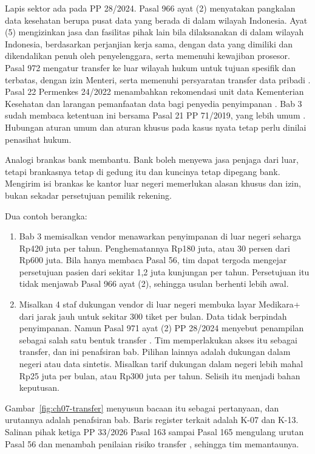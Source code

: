 Lapis sektor ada pada PP 28/2024. Pasal 966 ayat (2) menyatakan pangkalan data kesehatan berupa
pusat data yang berada di dalam wilayah Indonesia. Ayat (5) mengizinkan jasa dan fasilitas pihak
lain bila dilaksanakan di dalam wilayah Indonesia, berdasarkan perjanjian kerja sama, dengan data
yang dimiliki dan dikendalikan penuh oleh penyelenggara, serta memenuhi kewajiban prosesor. Pasal
972 mengatur transfer ke luar wilayah hukum untuk tujuan spesifik dan terbatas, dengan izin Menteri,
serta memenuhi persyaratan transfer data pribadi \cite{pp28-2024-kesehatan}. Pasal 22 Permenkes
24/2022 menambahkan rekomendasi unit data Kementerian Kesehatan dan larangan pemanfaatan data bagi
penyedia penyimpanan \cite{permenkes24-2022}. Bab 3 sudah membaca ketentuan ini bersama Pasal 21 PP
71/2019, yang lebih umum \cite{pp71-2019-pste}. Hubungan aturan umum dan aturan khusus pada kasus
nyata tetap perlu dinilai penasihat hukum.

Analogi brankas bank membantu. Bank boleh menyewa jasa penjaga dari luar, tetapi brankasnya tetap di
gedung itu dan kuncinya tetap dipegang bank. Mengirim isi brankas ke kantor luar negeri memerlukan
alasan khusus dan izin, bukan sekadar persetujuan pemilik rekening.

Dua contoh berangka:
\begin{enumerate}
  \item Bab 3 memisalkan vendor menawarkan penyimpanan di luar negeri seharga Rp420 juta per tahun.
  Penghematannya Rp180 juta, atau 30 persen dari Rp600 juta. Bila hanya membaca Pasal 56, tim dapat
  tergoda mengejar persetujuan pasien dari sekitar 1,2 juta kunjungan per tahun. Persetujuan itu
  tidak menjawab Pasal 966 ayat (2), sehingga usulan berhenti lebih awal.
  \item Misalkan 4 staf dukungan vendor di luar negeri membuka layar Medikara+ dari jarak jauh untuk
  sekitar 300 tiket per bulan. Data tidak berpindah penyimpanan. Namun Pasal 971 ayat (2) PP 28/2024
  menyebut penampilan sebagai salah satu bentuk transfer \cite{pp28-2024-kesehatan}. Tim
  memperlakukan akses itu sebagai transfer, dan ini penafsiran bab. Pilihan lainnya adalah dukungan
  dalam negeri atau data sintetis. Misalkan tarif dukungan dalam negeri lebih mahal Rp25 juta per
  bulan, atau Rp300 juta per tahun. Selisih itu menjadi bahan keputusan.
\end{enumerate}

Gambar~\ref{fig:ch07-transfer} menyusun bacaan itu sebagai pertanyaan, dan urutannya adalah
penafsiran bab. Baris register terkait adalah K-07 dan K-13. Salinan pihak ketiga PP 33/2026 Pasal
163 sampai Pasal 165 mengulang urutan Pasal 56 dan menambah penilaian risiko transfer
\cite{c03-pp33-nonresmi}, sehingga tim memantaunya.


